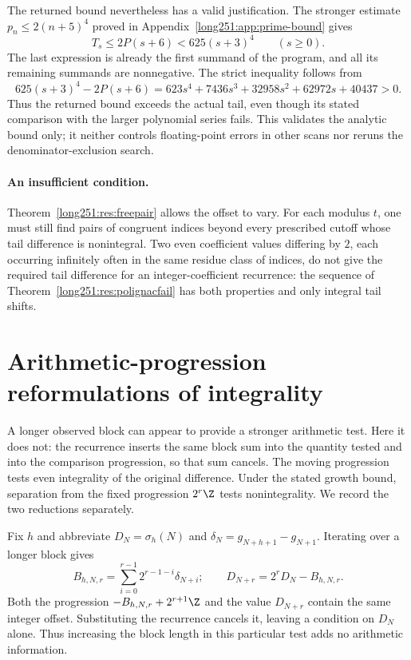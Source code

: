 The returned bound nevertheless has a valid justification.  The stronger
estimate $p_n\le2(n+5)^4$ proved in
Appendix~\ref{long251:app:prime-bound} gives
\[
 T_s\le2P(s+6)<625(s+3)^4\qquad(s\ge0).
\]
The last expression is already the first summand of the program, and
all its remaining summands are nonnegative.  The strict inequality
follows from
\[
 625(s+3)^4-2P(s+6)
 =623s^4+7436s^3+32958s^2+62972s+40437>0.
\]
Thus the returned bound exceeds the actual tail, even though its stated
comparison with the larger polynomial series fails.  This validates the
analytic bound only; it neither controls floating-point errors in other
scans nor reruns the denominator-exclusion search.

\paragraph{An insufficient condition.}  Theorem~\ref{long251:res:freepair} allows the offset to vary.  For each
modulus $t$, one must still find pairs of congruent indices beyond every
prescribed cutoff whose tail difference is nonintegral.
Two even coefficient values differing by $2$, each occurring infinitely
often in the same residue class of indices, do not give the required
tail difference for an integer-coefficient recurrence: the sequence of
Theorem~\ref{long251:res:polignacfail} has both properties and only
integral tail shifts.

\section{Arithmetic-progression reformulations of integrality}
\label{long251:app:affine-detail}
A longer observed block can appear to provide a stronger arithmetic test.
Here it does not: the recurrence inserts the same block sum into the
quantity tested and into the comparison progression, so that sum cancels.
The moving progression tests even integrality of the original difference.
Under the stated growth bound, separation from the fixed progression
$2^r\Z$ tests nonintegrality.  We record the two reductions separately.

Fix $h$ and abbreviate $D_N=\sigma_h(N)$ and
$\delta_N=g_{N+h+1}-g_{N+1}$.  Iterating over a longer block gives
\[
 B_{h,N,r}=\sum_{i=0}^{r-1}2^{r-1-i}\delta_{N+i};
 \qquad D_{N+r}=2^rD_N-B_{h,N,r}.
\]
Both the progression $-B_{h,N,r}+2^{r+1}\Z$ and the value $D_{N+r}$
contain the same integer offset.  Substituting the recurrence cancels
it, leaving a condition on $D_N$ alone.  Thus increasing the block
length in this particular test adds no arithmetic information.

